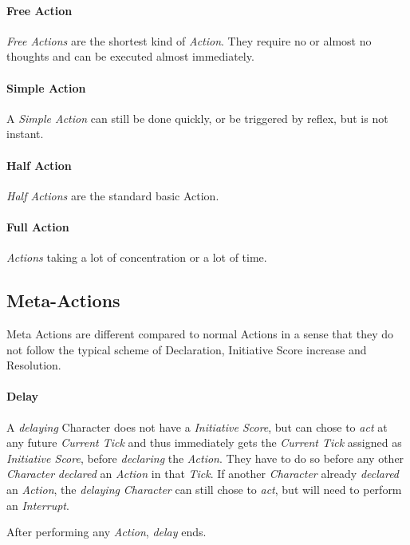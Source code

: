 \paragraph{Free Action}
\emph{Free Actions} are the shortest kind of \emph{Action}. They require no or almost no thoughts
and can be executed almost immediately.

\paragraph{Simple Action}
A \emph{Simple Action} can still be done quickly, or be triggered by reflex, but is
not instant.

\paragraph{Half Action}
\emph{Half Actions }are the standard basic Action.

\paragraph{Full Action}
\emph{Actions} taking a lot of concentration or a lot of time.

\subsection{Meta-Actions}

Meta Actions are different compared to normal Actions in a sense that they do not
follow the typical scheme of Declaration, Initiative Score increase and Resolution.

\paragraph{Delay}
A \emph{delaying} Character does not have a \emph{Initiative Score}, but can chose to
\emph{act} at any future \emph{Current Tick} and thus immediately gets the
\emph{Current Tick} assigned as \emph{Initiative Score}, before \emph{declaring }
the \emph{Action}. They have to do so before
any other \emph{Character} \emph{declared} an \emph{Action} in that \emph{Tick}.
If another \emph{Character} already \emph{declared} an \emph{Action},
the \emph{delaying} \emph{Character} can still chose to \emph{act},
but will need to perform an \emph{Interrupt}.

After performing any \emph{Action}, \emph{delay} ends.

